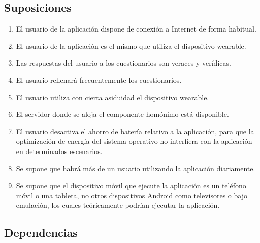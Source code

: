     \subsection{Suposiciones}
        \label{req:descripcion:suposiciones}

        \begin{enumerate}[label=\textbf{SUP-\arabic*}]
            \item El usuario de la aplicación dispone de conexión a Internet de forma habitual.
            \item El usuario de la aplicación es el mismo que utiliza el dispositivo \gls{wearable}.
            \item Las respuestas del usuario a los cuestionarios son veraces y verídicas.
            \item El usuario rellenará frecuentemente los cuestionarios.
            \item El usuario utiliza con cierta asiduidad el dispositivo \gls{wearable}.
            \item El servidor donde se aloja el componente homónimo está disponible.
            \item El usuario desactiva el ahorro de batería relativo a la aplicación, para que la optimización de energía del sistema operativo no interfiera con la aplicación en determinados escenarios.
            \item Se supone que habrá más de un usuario utilizando la aplicación diariamente.
            \item Se supone que el dispositivo móvil que ejecute la aplicación es un teléfono móvil o una tableta, no otros dispositivos Android como televisores o bajo emulación, los cuales teóricamente podrían ejecutar la aplicación.
        \end{enumerate}
        
    \subsection{Dependencias}
        \label{req:descripcion:dependencias}
    
